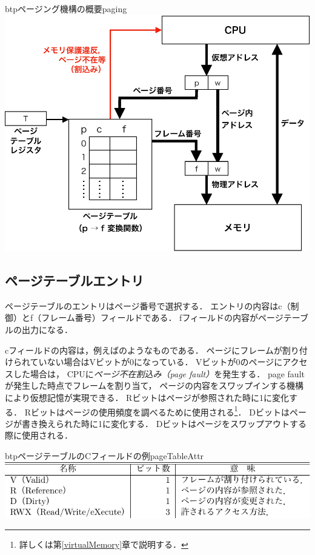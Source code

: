 \begin{myfig}{btp}{ページング機構の概要}{paging}
  \includegraphics[scale=0.66]{Fig/paging-crop.pdf}
\end{myfig}

\subsection{ページテーブルエントリ}
ページテーブルのエントリはページ番号で選択する．
エントリの内容はc（制御）とf（フレーム番号）フィールドである．
fフィールドの内容がページテーブルの出力になる．

cフィールドの内容は，例えばのようなものである．
ページにフレームが割り付けられていない場合はVビットが0になっている．
Vビットが0のページにアクセスした場合は，
CPUに\emph{ページ不在割込み（page fault）}を発生する．
page fault が発生した時点でフレームを割り当て，
ページの内容をスワップインする機構により仮想記憶が実現できる．
Rビットはページが参照された時に1に変化する．
Rビットはページの使用頻度を調べるために使用される\footnote{
  詳しくは第\ref{virtualMemory}章で説明する．}．
Dビットはページが書き換えられた時に1に変化する．
Dビットはページをスワップアウトする際に使用される．

\begin{mytable}{btp}{ページテーブルのCフィールドの例}{pageTableAttr}
  \includegraphics[scale=1.0]{Tbl/pageTableAttr.pdf}
\end{mytable}

